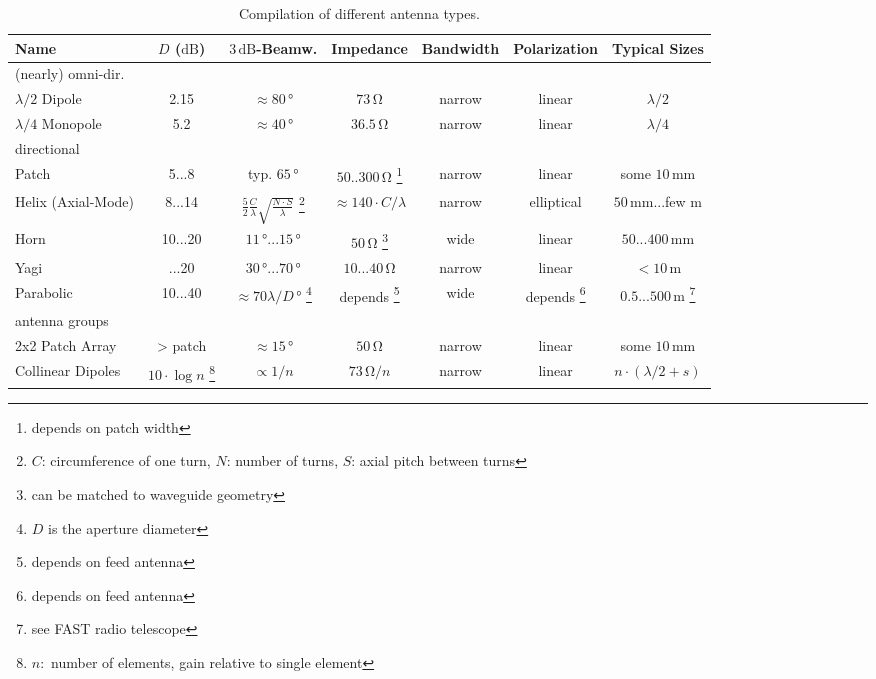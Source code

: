 
\begin{table}[h]

\centering

\begin{minipage}{\textwidth}
\begin{tabular}{lcccccc} \toprule
    {Name} & {$D$ ($\si{\deci\bel}$)} & {$3\,\si{\deci\bel}$-Beamw.} & {Impedance} & {Bandwidth} & {Polarization} & {Typical Sizes} \\ \midrule\midrule
  {(nearly) omni-dir.} & & & & & & \\
  \midrule
    {$\lambda/2$ Dipole}  & 2.15 & $\approx 80\,\si{\degree}$ & $73\,\si{\ohm}$ & narrow & linear & $\lambda/2$  \\
  {$\lambda/4$ Monopole}  & 5.2  & $\approx 40\,\si{\degree}$ & $36.5\,\si{\ohm}$ & narrow & linear & $\lambda/4$ \\
  \midrule
  {directional} & & & & & & \\
  \midrule
    {Patch}  & 5{...}8  & typ. $65\,\si{\degree}$ & $50..300\,\si{\ohm}$ \footnote{depends on patch width}  & narrow & linear & some $10 \,\si{\milli\meter}$\\
    {Helix (Axial-Mode)}  & 8...14 & $\frac{5}{2}\frac{C}{\lambda}\sqrt{\frac{N\cdot S}{\lambda}}$  \footnote{$C$: circumference of one turn, $N$: number of turns, $S$: axial pitch between turns}  & $\approx 140\cdot C / \lambda$  & narrow & elliptical & $50\,\si{\milli\meter}$...few $\si{\meter}$\\
    {Horn}  & 10{...}20  & $11\,\si{\degree}...15\,\si{\degree}$  & $50\,\si{\ohm}$ \footnote{can be matched to waveguide geometry}  & wide & linear & $50...400\,\si{\mm}$ \\
    {Yagi}  & {...}20  & $30\,\si{\degree}...70\,\si{\degree}$ & $10...40\,\si{\ohm}$  & narrow & linear & $<10\,\si{\meter}$ \\
    {Parabolic}  & 10{...}40  & $\approx 70\lambda / D\,\si{\degree}$ \footnote{$D$ is the aperture diameter} & depends \footnote{depends on feed antenna}  & wide & depends \footnote{depends on feed antenna}  & $0.5...500\,\si{\meter}$ \footnote{see FAST radio telescope} \\ \midrule
  {antenna groups} & & & & & & \\
  \midrule
    {2x2 Patch Array}  & > patch  & $\approx 15\,\si{\degree}$ & $50\,\si{\ohm}$ & narrow  & linear &  some $10\,\si{\milli\meter}$\\
    {Collinear Dipoles}  & $10\cdot\log{n}$ \footnote{$n:$ number of elements, gain relative to single element}  & $\propto 1/n$ & $73\,\si{\ohm} / n$ & narrow & linear & $n \cdot (\lambda / 2 + s)$ \\
    \bottomrule
\end{tabular}
\end{minipage}

\caption{Compilation of different antenna types.}\label{tab:ant1}

\end{table}

